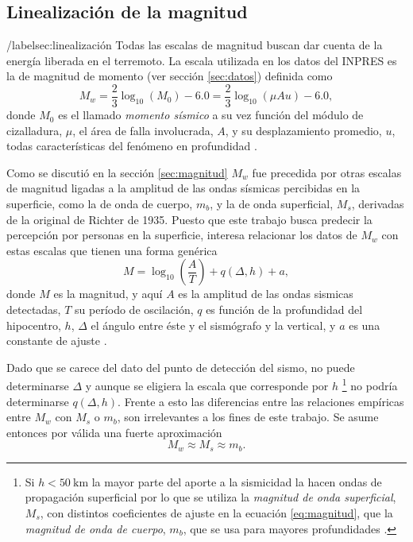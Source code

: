 \documentclass[a4paper]{report}
\begin{document}
\subsection{Linealización de la magnitud}/label{sec:linealización}
Todas las escalas de magnitud buscan dar cuenta de la energía liberada en el terremoto.
La escala utilizada en los datos del INPRES es la de magnitud de momento (ver sección \ref{sec:datos}) definida como \cite[ec. 4.23]{fowler_solid_1990}
\begin{equation}
	M_w =
	\frac{2}{3} \log_{10} \left( M_0 \right) - 6.0 = 
	\frac{2}{3} \log_{10} \left( \mu A u \right) - 6.0,
	\label{eq:momento}
\end{equation}
donde \(M_0\) es el llamado \emph{momento sísmico} a su vez función del módulo de cizalladura, \(\mu\), el área de falla involucrada, \(A\), y su desplazamiento promedio, \(u\), todas características del fenómeno en profundidad \cite*[sección 4.2.4]{fowler_solid_1990}.

Como se discutió en la sección \ref{sec:magnitud} \(M_w\) fue precedida por otras escalas de magnitud ligadas a la amplitud de las ondas sísmicas percibidas en la superficie, como la de onda de cuerpo, \(m_b\), y la de onda superficial, \(M_s\), derivadas de la original de Richter de 1935.
Puesto que este trabajo busca predecir la percepción por personas en la superficie, interesa relacionar los datos de \(M_w\) con estas escalas que tienen una forma genérica
\begin{equation}
	M = \log_{10} \left( \frac{A}{T} \right) + q(\Delta, h) + a,
	\label{eq:magnitud}
\end{equation}
donde \(M\) es la magnitud, y aquí \(A\) es la amplitud de las ondas sismicas detectadas, \(T\) su período de oscilación, \(q\) es función de la profundidad del hipocentro, \(h\), \(\Delta\) el ángulo entre éste y el sismógrafo y la vertical, y \(a\) es una constante de ajuste \cite[ecuación 4.13]{fowler_solid_1990}.

Dado que se carece del dato del punto de detección del sismo, no puede determinarse \(\Delta\) y aunque se eligiera la escala que corresponde por \(h\) \footnote{Si \(h< \SI{50}{\kilo\metre}\) la mayor parte del aporte a la sismicidad la hacen ondas de propagación superficial por lo que se utiliza la \emph{magnitud de onda superficial}, \(M_s\), con distintos coeficientes de ajuste en la ecuación \ref{eq:magnitud}, que la \emph{magnitud de onda de cuerpo}, \(m_b\), que se usa para mayores profundidades \cite[sección 4.2.3]{fowler_solid_1990}.} no podría determinarse \(q(\Delta, h)\).
Frente a esto las diferencias entre las relaciones empíricas entre \(M_w\) con \(M_s\) o \(m_b\)\cite{hanks_moment_1979}, son irrelevantes a los fines de este trabajo.
Se asume entonces por válida una fuerte aproximación
\begin{equation}
	M_w \approx M_s \approx m_b.
	\label{eq:igualdad}
\end{equation}
\end{document}
